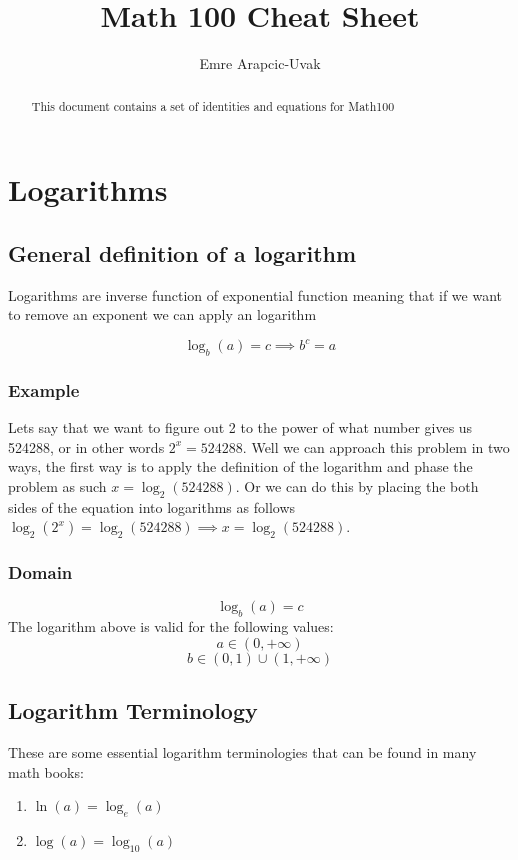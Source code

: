 \documentclass[a4paper, 15pt]{article}
\title{Math 100 Cheat Sheet}
\author{Emre Arapcic-Uvak}
\date{}
\begin{document}
	\maketitle
	\vspace{5mm}
	
	\begin{abstract}
		\begin{center}
			\noindent This document contains a set of identities and equations for Math100
		\end{center}
	\end{abstract}
	\pagebreak
	
	\tableofcontents
	\pagebreak
	
	\section{Logarithms}
		\subsection{General definition of a logarithm}
			\noindent Logarithms are inverse function of exponential function meaning that if we want to remove an exponent we can apply an logarithm
			
			\begin{equation*}
				\log_{b}(a) = c \implies b^c = a
			\end{equation*}
		
			\subsubsection{Example}
				\noindent Lets say that we want to figure out 2 to the power of what number gives us 524288, or in other words $2^x = 524288$. Well we can approach this problem in two ways, the first way is to apply the definition of the logarithm and phase the problem as such $x = \log_{2}(524288)$. Or we can do this by placing the both sides of the equation into logarithms as follows $\log_{2}(2^x) = \log_{2}(524288) \implies x = \log_{2}(524288)$.
				
				
			\subsubsection{Domain}
				\[\log_{b}(a) = c\]
				\noindent The logarithm above is valid for the following values:
				\[a \in (0, +\infty)\]
				\[b \in (0,1) \cup (1, +\infty)\]
		\subsection{Logarithm Terminology}
			\noindent These are some essential logarithm terminologies that can be found in many math books:
			\begin{enumerate}
				\item $\ln(a) = \log_{e}(a)$
				\item $\log(a) = \log_{10}(a)$
			\end{enumerate}
\end{document}
